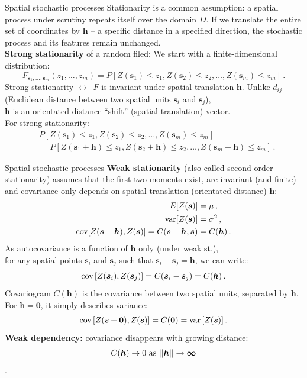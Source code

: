 \documentclass{beamer}
\begin{document}
\begin{frame}{Spatial stochastic processes}
Stationarity is a common assumption: a spatial process under scrutiny repeats itself over the domain $D$. If we translate the entire set of coordinates by $\bm{h}$ -- a specific distance in a specified direction, the stochastic process and its features remain unchanged.\\
\medskip
\textbf{Strong stationarity} of a random filed: We start with a finite-dimensional distribution: 
$$F_{\bm{s}_1, \dots,\bm{s}_m }(z_1,\dots, z_m) = P[Z(\bm{s}_1) \leq z_1, Z(\bm{s}_2) \leq z_2, \dots, Z(\bm{s}_m) \leq z_m] \, .$$  
Strong stationarity $\leftrightarrow$~$F$ is invariant under spatial translation $\bm{h}$. Unlike $d_{ij}$ (Euclidean distance between two spatial units $\bm{s}_i$ and $\bm{s}_j$), \\$\bm{h}$ is an orientated distance ``shift'' (spatial translation) vector. \\For strong stationarity:
\begin{equation*}
\begin{aligned}
& P \left[Z(\bm{s}_1) \leq z_1, Z(\bm{s}_2) \leq z_2, \dots, Z(\bm{s}_m) \leq z_m \right] \\
& = P \left[Z(\bm{s}_1+\bm{h}) \leq z_1, Z(\bm{s}_2+\bm{h}) \leq z_2, \dots, Z(\bm{s}_m+\bm{h}) \leq z_m \right] \, .
\end{aligned} 
\end{equation*}
\end{frame}
\begin{frame}{Spatial stochastic processes}
\vspace{-0.2cm}
\textbf{Weak  stationarity} (also called second order stationarity) assumes that the first two moments exist, are invariant (and finite) and covariance only depends on spatial translation (orientated distance) $\bm{h}$:
\begin{equation*}
\begin{aligned}  
E[Z(\bm{s})] &= \mu \,, \\
\textnormal{var}[Z(\bm{s})] & = \sigma^2 \,, \\
\textnormal{cov} [Z(\bm{s}+\bm{h}),Z(\bm{s})] = C(\bm{s}+\bm{h}, \bm{s}) & = C(\bm{h}) \,.
\end{aligned} 
\end{equation*}
As autocovariance is a function of $\bm{h}$ only (under weak st.), \\for any spatial points $\bm{s}_i$ and $\bm{s}_j$ such that $\bm{s}_i -\bm{s}_j = \bm{h}$, we can write: 
\begin{equation*}
\textnormal{cov} \left[ Z(\bm{s}_i), Z(\bm{s}_j) \right] = C(\bm{s}_i - \bm{s}_j) = C(\bm{h}) \,.  
\end{equation*}
Covariogram $C(\bm{h})$ is the covariance between two spatial units, separated by $\bm{h}$. For $\bm{h} = \bm{0}$, it simply describes variance: 
$$\textnormal{cov}\,[Z(\bm{s}+\bm{0}),Z(\bm{s})] =  C(\bm{0}) = \textnormal{var}\,[Z(\bm{s})]\,.$$
\textbf{Weak dependency:} covariance disappears with growing distance: 
$$C(\bm{h}) \rightarrow 0~\textnormal{as}~||\bm{h}|| \rightarrow \bm{\infty}$$.
\end{frame}
\end{document}
